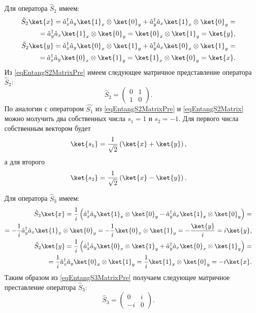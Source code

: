 Для оператора $\hat{S}_2$ имеем:
\begin{eqnarray}
\hat{S}_2 \ket{x} = \hat{a}_x^{\dag} \hat{a}_y
\ket{1}_x\otimes\ket{0}_y + \hat{a}_y^{\dag}
\hat{a}_x\ket{1}_x\otimes\ket{0}_y =
\nonumber \\
= 
\hat{a}_y^{\dag}
\hat{a}_x\ket{1}_x\otimes\ket{0}_y =
\ket{0}_x\otimes\ket{1}_y = \ket{y},
\nonumber \\
\hat{S}_2 \ket{y} = \hat{a}_x^{\dag} \hat{a}_y
\ket{0}_x\otimes\ket{1}_y + \hat{a}_y^{\dag}
\hat{a}_x\ket{0}_x\otimes\ket{1}_y =
\nonumber \\
=
\hat{a}_x^{\dag} \hat{a}_y
\ket{0}_x\otimes\ket{1}_y
=\ket{1}_x\otimes\ket{0}_y = \ket{x}.
\label{eqEntangS2MatrixPre}
\end{eqnarray}
Из \eqref{eqEntangS2MatrixPre} имеем следующее матричное представление
оператора $\hat{S}_2$:
\begin{equation}
\hat{S}_2 = 
\left(
\begin{array}{cc}
0 & 1 \\
1 & 0 
\end{array}
\right).
\label{eqEntangS2Matrix}
\end{equation}
По аналогии с оператором $\hat{S_1}$ из \eqref{eqEntangS2MatrixPre} и
\eqref{eqEntangS2Matrix} можно молучить два собственных числа $s_1 =
1$ и $s_2 = -1$.
Для первого числа собственным вектором будет
\begin{equation}
\ket{s_1} = \frac{1}{\sqrt{2}}\left(\ket{x} +
\ket{y}\right),
\label{eq:part2:pol:stocks_s2_1}
\end{equation}
а для второго
\begin{equation}
\ket{s_2} = \frac{1}{\sqrt{2}}\left(\ket{x} - \ket{y}\right).
\label{eq:part2:pol:stocks_s2_2}
\end{equation}

Для оператора $\hat{S}_3$ имеем:
\begin{eqnarray}
  \hat{S}_3 \ket{x} = \frac{1}{i}\left(\hat{a}_x^{\dag} \hat{a}_y
\ket{1}_x\otimes\ket{0}_y - \hat{a}_y^{\dag}
\hat{a}_x\ket{1}_x\otimes\ket{0}_y\right) =
\nonumber \\
= 
-\frac{1}{i}\hat{a}_y^{\dag}
\hat{a}_x\ket{1}_x\otimes\ket{0}_y =
-\frac{1}{i}\ket{0}_x\otimes\ket{1}_y =
-\frac{\ket{y}}{i} = i \ket{y},
\nonumber \\
\hat{S}_2 \ket{y} = \frac{1}{i}\left(\hat{a}_x^{\dag} \hat{a}_y
\ket{0}_x\otimes\ket{1}_y + \hat{a}_y^{\dag}
\hat{a}_x\ket{0}_x\otimes\ket{1}_y\right) =
\nonumber \\
=
\frac{1}{i}\hat{a}_x^{\dag} \hat{a}_y
\ket{0}_x\otimes\ket{1}_y
=\frac{1}{i}\ket{1}_x\otimes\ket{0}_y =
-i \ket{x}.
\label{eqEntangS3MatrixPre}
\end{eqnarray}
Таким образом из \eqref{eqEntangS3MatrixPre} получаем следующее
матричное преставление оператора $\hat{S}_3$:
\begin{equation}
\hat{S}_3 = 
\left(
\begin{array}{cc}
0 & i \\
-i & 0 
\end{array}
\right).
\label{eqEntangS3Matrix}
\end{equation}

